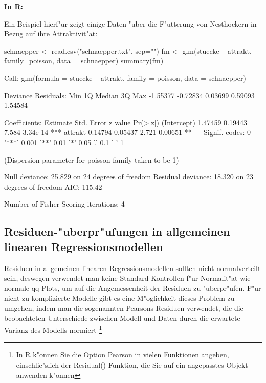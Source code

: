 \documentclass[a4paper,twoside]{tufte-book}\usepackage[]{graphicx}\usepackage[]{color}
\begin{document}
\vspace{1cm}
\begin{fullwidth}
\begin{mdframed}
    
\textbf{In R:} 

Ein Beispiel hierf"ur zeigt einige Daten "uber die F"utterung von Nesthockern in Bezug auf ihre Attraktivit"at:
\begin{Schunk}
\begin{Sinput}
schnaepper <- read.csv("schnaepper.txt", sep="")
fm <- glm(stuecke ~ attrakt, family=poisson, data = schnaepper)
summary(fm)
\end{Sinput}
\begin{Soutput}

Call:
glm(formula = stuecke ~ attrakt, family = poisson, data = schnaepper)

Deviance Residuals: 
     Min        1Q    Median        3Q       Max  
-1.55377  -0.72834   0.03699   0.59093   1.54584  

Coefficients:
            Estimate Std. Error z value Pr(>|z|)    
(Intercept)  1.47459    0.19443   7.584 3.34e-14 ***
attrakt      0.14794    0.05437   2.721  0.00651 ** 
---
Signif. codes:  0 '***' 0.001 '**' 0.01 '*' 0.05 '.' 0.1 ' ' 1

(Dispersion parameter for poisson family taken to be 1)

    Null deviance: 25.829  on 24  degrees of freedom
Residual deviance: 18.320  on 23  degrees of freedom
AIC: 115.42

Number of Fisher Scoring iterations: 4
\end{Soutput}
\end{Schunk}

\end{mdframed}
\end{fullwidth} 


\subsection{Residuen-"uberpr"ufungen in allgemeinen linearen Regressionsmodellen}

Residuen in allgemeinen linearen Regressionsmodellen sollten nicht normalverteilt sein, deswegen verwendet man keine Standard-Kontrollen f"ur Normalit"at wie normale qq-Plots, um auf die Angemessenheit der Residuen zu "uberpr"ufen. F"ur nicht zu komplizierte Modelle gibt es eine M"oglichkeit dieses Problem zu umgehen, indem man die sogenannten Pearsons-Residuen verwendet, die die beobachteten Unterschiede zwischen Modell und Daten durch die erwartete Varianz des Modells normiert \footnote{In R k"onnen Sie die Option Pearson in vielen Funktionen angeben, einschlie"slich der Residual()-Funktion, die Sie auf ein angepasstes Objekt anwenden k"onnen}
\end{document}
